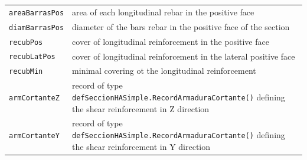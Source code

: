 \begin{center}
\begin{tabular}{lp{10cm}}
{\tt areaBarrasPos} & area of each longitudinal rebar in  the positive face \\
{\tt diamBarrasPos} & diameter of the bars rebar in  the positive face of the section \\
{\tt recubPos} & cover of longitudinal reinforcement in the positive face\\
{\tt recubLatPos} & cover of longitudinal reinforcement in the lateral positive face\\
{\tt recubMin} & minimal covering ot the longitudinal reinforcement \\
{\tt armCortanteZ} & record of type {\tt defSeccionHASimple.RecordArmaduraCortante()} defining the shear reinforcement in Z direction \\
{\tt armCortanteY} & record of type {\tt defSeccionHASimple.RecordArmaduraCortante()} defining the shear reinforcement in Y direction \\
\end{tabular}
\end{center}
